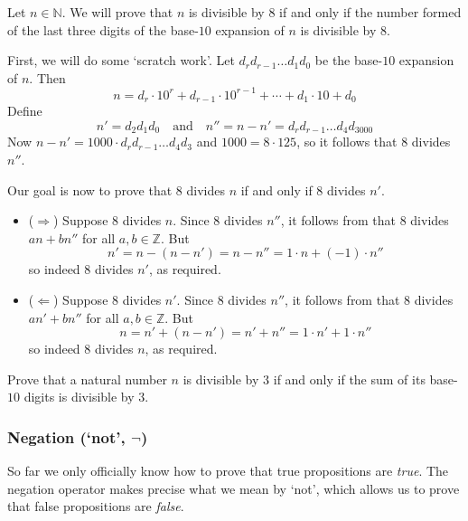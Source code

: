 \begin{example}
\label{exTestForDivisibilityByEight}
Let $n \in \mathbb{N}$. We will prove that $n$ is divisible by $8$ if and only if the number formed of the last three digits of the base-$10$ expansion of $n$ is divisible by $8$.

First, we will do some `scratch work'. Let $d_rd_{r-1}\dots{}d_1d_0$ be the base-$10$ expansion of $n$. Then
\[
n = d_r \cdot 10^r + d_{r-1} \cdot 10^{r-1} + \cdots + d_1 \cdot 10 + d_0
\]
Define
\[
n' = d_2d_1d_0 \quad \text{and} \quad n'' = n-n' = d_rd_{r-1}\dots{}d_4d_3000
\]
Now $n-n' = 1000 \cdot d_rd_{r-1} \dots d_4d_3$ and $1000 = 8 \cdot 125$, so it follows that $8$ divides $n''$.

Our goal is now to prove that $8$ divides $n$ if and only if $8$ divides $n'$.

\begin{itemize}
\item ($\Rightarrow$) Suppose $8$ divides $n$. Since $8$ divides $n''$, it follows from  that $8$ divides $an+bn''$ for all $a,b \in \mathbb{Z}$. But
\[
n' = n-(n-n') = n-n'' = 1 \cdot n + (-1) \cdot n''
\]
so indeed $8$ divides $n'$, as required.
\item ($\Leftarrow$)  Suppose $8$ divides $n'$. Since $8$ divides $n''$, it follows from  that $8$ divides $an'+bn''$ for all $a,b \in \mathbb{Z}$. But
\[
n = n'+(n-n') = n'+n'' = 1 \cdot n' + 1 \cdot n''
\]
so indeed $8$ divides $n$, as required.
\end{itemize}
\end{example}

\begin{exercise}
Prove that a natural number $n$ is divisible by $3$ if and only if the sum of its base-$10$ digits is divisible by $3$.
\end{exercise}

\subsubsection*{Negation (`not', $\neg$)}

So far we only officially know how to prove that true propositions are \textit{true}. The negation operator makes precise what we mean by `not', which allows us to prove that false propositions are \textit{false}.

